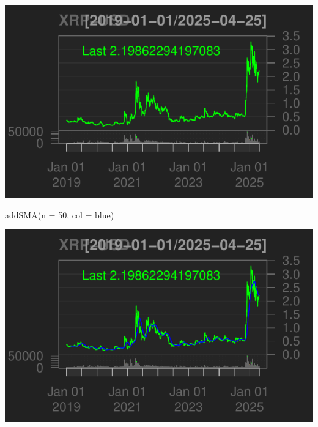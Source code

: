 \documentclass[]{tufte-handout}
\newenvironment{Shaded}{}{}
\newcommand{\AttributeTok}[1]{\textcolor[rgb]{0.49,0.56,0.16}{#1}}
\newcommand{\DecValTok}[1]{\textcolor[rgb]{0.25,0.63,0.44}{#1}}
\newcommand{\FunctionTok}[1]{\textcolor[rgb]{0.02,0.16,0.49}{#1}}
\newcommand{\NormalTok}[1]{#1}
\newcommand{\StringTok}[1]{\textcolor[rgb]{0.25,0.44,0.63}{#1}}
\begin{document}
\includegraphics{cripto_update_files/figure-latex/unnamed-chunk-9-1}

\begin{Shaded}
\begin{Highlighting}[]
\FunctionTok{addSMA}\NormalTok{(}\AttributeTok{n =} \DecValTok{50}\NormalTok{, }\AttributeTok{col =} \StringTok{\textquotesingle{}blue\textquotesingle{}}\NormalTok{)}
\end{Highlighting}
\end{Shaded}

\includegraphics{cripto_update_files/figure-latex/unnamed-chunk-9-2}
\end{document}
